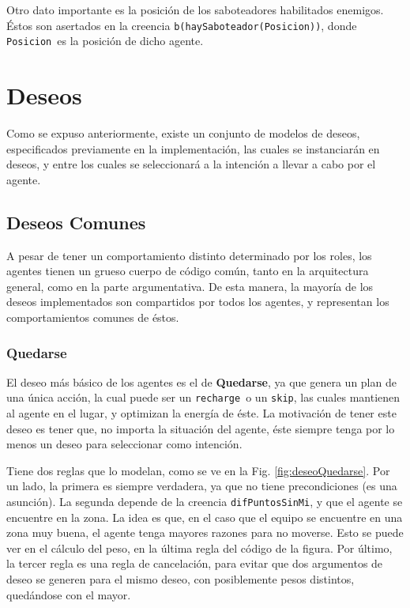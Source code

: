 \documentclass[oneside]{book}
\theoremstyle{definition}
\theoremstyle{example}
\begin{document}
Otro dato importante es la posición de los saboteadores habilitados enemigos.
Éstos son asertados en la creencia \texttt{b(haySaboteador(Posicion))}, donde 
\texttt{Posicion}\ es la posición de dicho agente.

\section{Deseos}

Como se expuso anteriormente, existe un conjunto de modelos de deseos, especificados
previamente en la implementación, las cuales se instanciarán en deseos, y entre los 
cuales se seleccionará a la intención a llevar a cabo por el agente.

\subsection{Deseos Comunes}

\label{sec:deseosComunes}

A pesar de tener un comportamiento distinto determinado por los roles, los agentes
tienen un grueso cuerpo de código común, tanto en la arquitectura general, como 
en la parte argumentativa. De esta manera, la mayoría de los deseos implementados son
compartidos por todos los agentes, y representan los comportamientos comunes de éstos.

\subsubsection{Quedarse}

El deseo más básico de los agentes es el de \textbf{Quedarse}, ya que genera un plan de 
una única acción, la cual puede ser un \texttt{recharge}\ o un \texttt{skip}, las cuales
mantienen al agente en el lugar, y optimizan la energía de éste. La 
motivación de tener este deseo es tener que, no importa la situación del agente, éste
siempre tenga por lo menos un deseo para seleccionar como intención.

Tiene dos reglas que lo modelan, como se ve en la Fig. \ref{fig:deseoQuedarse}. Por un
lado, la primera es siempre verdadera, ya que no tiene precondiciones (es una asunción).
La segunda depende de la creencia \texttt{difPuntosSinMi}, y que el agente se encuentre
en la zona. La idea es que, en el caso que el equipo se encuentre en una zona muy buena,
el agente tenga mayores razones para no moverse. Esto se puede ver en el cálculo del 
peso, en la última regla del código de la figura. Por último, la tercer regla es una
regla de cancelación, para evitar que dos argumentos de deseo se generen para el mismo
deseo, con posiblemente pesos distintos, quedándose con el mayor.
\end{document}
